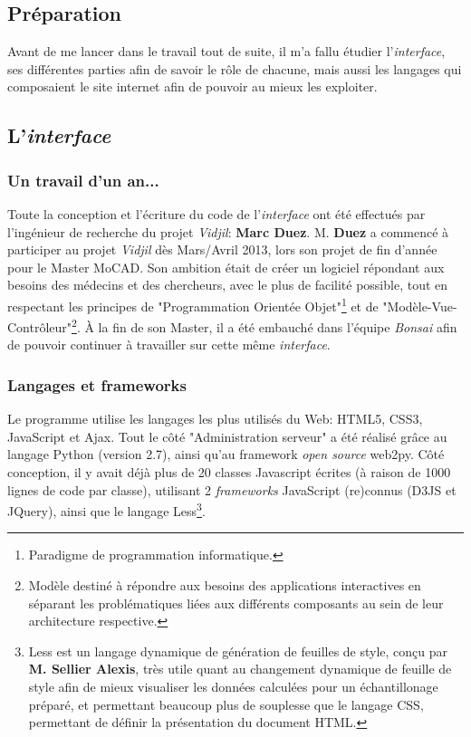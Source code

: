\documentclass[pdftex,12pt,a4paper]{report}
\begin{document}
\begin{spacing}{1.2}
\chapter{Préparation}

Avant de me lancer dans le travail tout de suite, il m'a fallu étudier l'\textit{interface}, ses différentes parties afin de savoir le rôle de chacune, mais aussi les langages qui composaient le site internet afin de pouvoir au mieux les exploiter.

\section{L'\textit{interface}}

\subsection{Un travail d'un an...}
Toute la conception et l'écriture du code de l'\textit{interface} ont été effectués par l'ingénieur de recherche du projet \textit{Vidjil}: \textbf{Marc Duez}. 
\newline
M. \textbf{Duez} a commencé à participer au projet \textit{Vidjil} dès Mars/Avril 2013, lors son projet de fin d'année pour le Master MoCAD.
Son ambition était de créer un logiciel répondant aux besoins des médecins et des chercheurs, avec le plus de facilité possible, tout en respectant les principes de "Programmation Orientée Objet"\footnote{Paradigme de programmation informatique.} et de "Modèle-Vue-Contrôleur"\footnote{Modèle destiné à répondre aux besoins des applications interactives en séparant les problématiques liées aux différents composants au sein de leur architecture respective.}.
\newline
À la fin de son Master, il a été embauché dans l'équipe \textit{Bonsai} afin de pouvoir continuer à travailler sur cette même \textit{interface}.

\subsection{Langages et frameworks}
Le programme utilise les langages les plus utilisés du Web: HTML5, CSS3, JavaScript et Ajax.
\newline
Tout le côté "Administration serveur" a été réalisé grâce au langage Python (version 2.7), ainsi qu'au framework \textit{open source} web2py.
\newline
Côté conception, il y avait déjà plus de 20 classes Javascript écrites (à raison de 1000 lignes de code par classe), utilisant 2 \textit{frameworks} JavaScript (re)connus (D3JS et JQuery), ainsi que le langage Less\footnote{Less est un langage dynamique de génération de feuilles de style, conçu par \textbf{M. Sellier Alexis}, très utile quant au changement dynamique de feuille de style afin de mieux visualiser les données calculées pour un échantillonage préparé, et permettant beaucoup plus de souplesse que le langage CSS, permettant de définir la présentation du document HTML.}.


\end{spacing}
\end{document}
